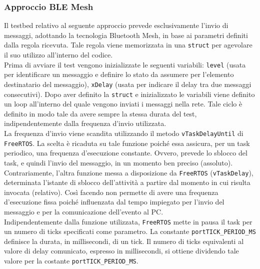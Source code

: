 \subsubsection{Approccio BLE Mesh}
\label{subsub:BLE}
Il testbed relativo al seguente approccio prevede esclusivamente l'invio di messaggi, adottando la tecnologia Bluetooth Mesh, in base ai parametri definiti dalla regola ricevuta. Tale regola viene memorizzata in una \texttt{struct} per agevolare il suo utilizzo all'interno del codice.\\
Prima di avviare il test vengono inizializzate le seguenti variabili: \texttt{level} (usata per identificare un messaggio e definire lo stato da assumere per l'elemento destinatario del messaggio), \texttt{xDelay} (usata per indicare il delay tra due messaggi consecutivi). Dopo aver definito la \texttt{struct} e inizializzato le variabili viene definito un loop all'interno del quale vengono inviati i messaggi nella rete. Tale ciclo è definito in modo tale da avere sempre la stessa durata del test, indipendentemente dalla frequenza d'invio utilizzata.\\

\noindent La frequenza d'invio viene scandita utilizzando il metodo \texttt{vTaskDelayUntil} di \texttt{FreeRTOS}. La scelta è ricaduta su tale funzione poiché essa assicura, per un task periodico, una frequenza d'esecuzione constante. Ovvero, prevede lo sblocco del task, e quindi l'invio del messaggio, in un momento ben preciso (assoluto). 
Contrariamente, l'altra funzione messa a disposizione da \texttt{FreeRTOS} (\texttt{vTaskDelay}), determinata l'istante di sblocco dell'attività a partire dal momento in cui risulta invocata (relativo). Così facendo non permette di avere una frequenza d'esecuzione fissa poiché influenzata dal tempo impiegato per l'invio del messaggio e per la comunicazione dell'evento al PC.\\

\noindent Indipendentemente dalla funzione utilizzata, \texttt{FreeRTOS} mette in pausa il task per un numero di ticks specificati come parametro. La constante \texttt{portTICK\_PERIOD\_MS} definisce la durata, in millisecondi, di un tick. Il numero di ticks equivalenti al valore di delay comunicato, espresso in millisecondi, si ottiene dividendo tale valore per la costante \texttt{portTICK\_PERIOD\_MS}.\\

